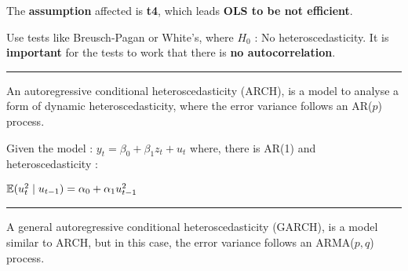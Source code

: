   \begin{f}

The \textbf{assumption} affected is \textbf{t4}, which leads \textbf{OLS to be not efficient}.

Use tests like Breusch-Pagan or White's, where $H_{0}$ : No heteroscedasticity. It is \textbf{important} for the tests to work that there is \textbf{no autocorrelation}.

\end{f}  \hrule  
\begin{f}[ARCH]

An autoregressive conditional heteroscedasticity (ARCH), is a model to analyse a form of dynamic heteroscedasticity, where the error variance follows an AR($p$) process.

Given the model : $y_{t} = \beta_{0} + \beta_{1} z_{t} + u_{t}$ where, there is AR(1) and heteroscedasticity :

\begin{center}
	$\mathbb{E}(u^{2}_{t} \mid u_{t - 1}) = \alpha_{0} + \alpha_{1} u^{2}_{t - 1}$
\end{center}

\end{f}  \hrule 
 \begin{f}[GARCH]

A general autoregressive conditional heteroscedasticity (GARCH), is a model similar to ARCH, but in this case, the error variance follows an ARMA($p, q$) process.
\end{f}